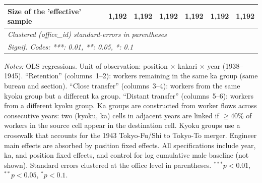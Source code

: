 \begin{table}[htbp]
\begin{threeparttable}
\begin{tabular}{lcccccc}
   Size of the 'effective' sample & 1,192          & 1,192          & 1,192         & 1,192          & 1,192          & 1,192\\  
   \midrule \midrule
   \multicolumn{7}{l}{\emph{Clustered (office\_id) standard-errors in parentheses}}\\
   \multicolumn{7}{l}{\emph{Signif. Codes: ***: 0.01, **: 0.05, *: 0.1}}\\
\end{tabular}
\begin{tablenotes}[flushleft]
\footnotesize
\item \textit{Notes:} OLS regressions. Unit of observation: position $\times$ kakari $\times$ year (1938--1945). ``Retention'' (columns~1--2): workers remaining in the same ka group (same bureau and section). ``Close transfer'' (columns~3--4): workers from the same kyoku group but a different ka group. ``Distant transfer'' (columns~5--6): workers from a different kyoku group. Ka groups are constructed from worker flows across consecutive years: two (kyoku, ka) cells in adjacent years are linked if $\geq$40\% of workers in the source cell appear in the destination cell. Kyoku groups use a crosswalk that accounts for the 1943 Tokyo-Fu/Shi to Tokyo-To merger. Engineer main effects are absorbed by position fixed effects. All specifications include year, ka, and position fixed effects, and control for log cumulative male baseline (not shown). Standard errors clustered at the office level in parentheses. $^{***}p<0.01$, $^{**}p<0.05$, $^{*}p<0.1$.
\end{tablenotes}
\end{threeparttable}
\end{table}
